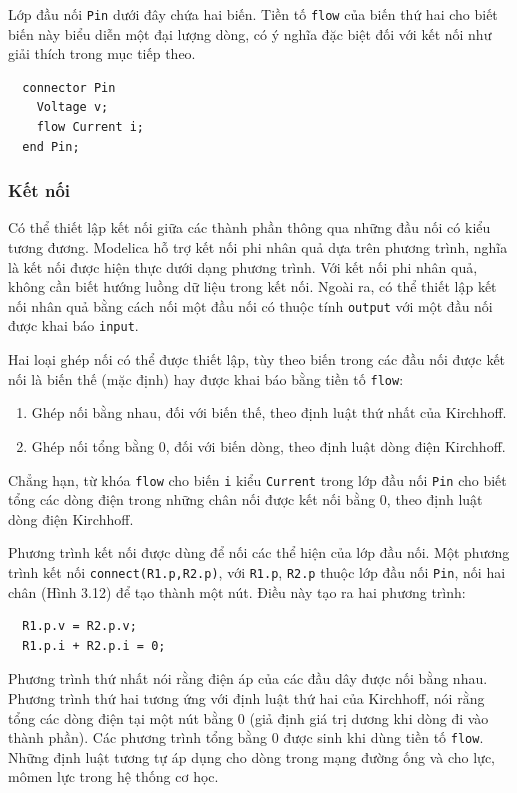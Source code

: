 Lớp đầu nối \texttt{Pin} dưới đây chứa hai biến. Tiền tố \texttt{flow} của biến thứ hai cho biết biến này biểu diễn một đại lượng dòng, có ý nghĩa đặc biệt đối với kết nối như giải thích trong mục tiếp theo.
\begin{verbatim}
  connector Pin
    Voltage v;
    flow Current i;
  end Pin;
\end{verbatim}

\subsubsection{Kết nối}
Có thể thiết lập kết nối giữa các thành phần thông qua những đầu nối có kiểu tương đương. Modelica hỗ trợ kết nối phi nhân quả dựa trên phương trình, nghĩa là kết nối được hiện thực dưới dạng phương trình. Với kết nối phi nhân quả, không cần biết hướng luồng dữ liệu trong kết nối. Ngoài ra, có thể thiết lập kết nối nhân quả bằng cách nối một đầu nối có thuộc tính \texttt{output} với một đầu nối được khai báo \texttt{input}.

Hai loại ghép nối có thể được thiết lập, tùy theo biến trong các đầu nối được kết nối là biến thế (mặc định) hay được khai báo bằng tiền tố \texttt{flow}:
\begin{enumerate}
\item Ghép nối bằng nhau, đối với biến thế, theo định luật thứ nhất của Kirchhoff.
\item Ghép nối tổng bằng 0, đối với biến dòng, theo định luật dòng điện Kirchhoff.
\end{enumerate}

Chẳng hạn, từ khóa \texttt{flow} cho biến \texttt{i} kiểu \texttt{Current} trong lớp đầu nối \texttt{Pin} cho biết tổng các dòng điện trong những chân nối được kết nối bằng 0, theo định luật dòng điện Kirchhoff.

Phương trình kết nối được dùng để nối các thể hiện của lớp đầu nối. Một phương trình kết nối \texttt{connect(R1.p,R2.p)}, với \texttt{R1.p}, \texttt{R2.p} thuộc lớp đầu nối \texttt{Pin}, nối hai chân (Hình 3.12) để tạo thành một nút. Điều này tạo ra hai phương trình:
\begin{verbatim}
  R1.p.v = R2.p.v;
  R1.p.i + R2.p.i = 0;
\end{verbatim}
Phương trình thứ nhất nói rằng điện áp của các đầu dây được nối bằng nhau. Phương trình thứ hai tương ứng với định luật thứ hai của Kirchhoff, nói rằng tổng các dòng điện tại một nút bằng 0 (giả định giá trị dương khi dòng đi vào thành phần). Các phương trình tổng bằng 0 được sinh khi dùng tiền tố \texttt{flow}. Những định luật tương tự áp dụng cho dòng trong mạng đường ống và cho lực, mômen lực trong hệ thống cơ học.

